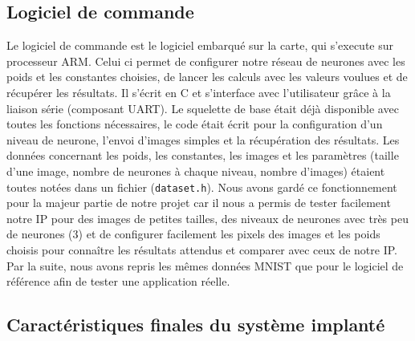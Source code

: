 \subsection{Logiciel de commande}
Le logiciel de commande est le logiciel embarqué sur la carte, qui s'execute
sur processeur ARM. Celui ci permet de configurer notre réseau de neurones avec
les poids et les constantes choisies, de lancer les calculs avec les valeurs
voulues et de récupérer les résultats. Il s'écrit en C et s'interface avec
l'utilisateur grâce à la liaison série (composant UART). Le squelette de base
était déjà disponible avec toutes les fonctions nécessaires, le code était
écrit pour la configuration d'un niveau de neurone, l'envoi d'images simples et
la récupération des résultats. Les données
concernant les poids, les constantes, les images et les paramètres (taille d'une
image, nombre de neurones à chaque niveau, nombre d'images) étaient toutes notées
dans un fichier (\texttt{dataset.h}). Nous avons gardé ce fonctionnement pour la
majeur partie de notre projet car il nous a permis de tester facilement notre
IP pour des images de petites tailles, des niveaux de neurones avec très peu
de neurones (3) et de configurer facilement les pixels des images et les poids
choisis pour connaître les résultats attendus et comparer avec ceux de notre IP.
Par la suite, nous avons repris les mêmes données MNIST que pour le logiciel de
référence afin de tester une application réelle. \\

\subsection{Caractéristiques finales du système implanté}























